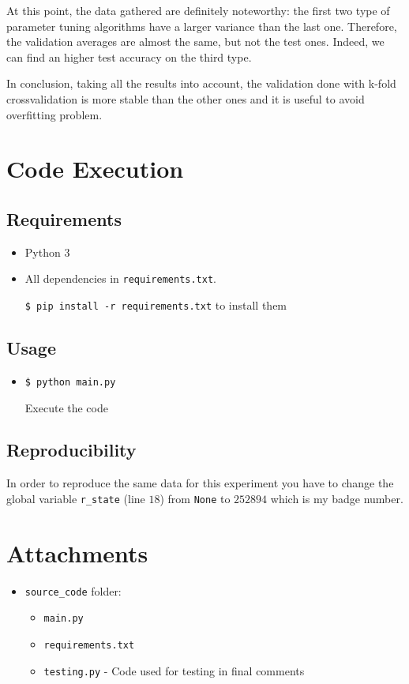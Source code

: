 \documentclass[a4paper, 11pt]{article}
\begin{document}
	At this point, the data gathered are definitely noteworthy: the first two type of parameter tuning algorithms have a larger variance than the last one. Therefore, the validation averages are almost the same, but not the test ones. Indeed, we can find an higher test accuracy on the third type.
	
	In conclusion, taking all the results into account, the validation done with k-fold crossvalidation is more stable than the other ones and it is useful to avoid overfitting problem.
		
	\section{Code Execution}
	\subsection{Requirements}
	\begin{itemize}
		\item Python 3
		\item All dependencies in \texttt{requirements.txt}.
		
		\texttt{\$ pip install -r requirements.txt} to install them
	\end{itemize}
	\subsection{Usage}
	\begin{itemize}
		\item \texttt{\$ python main.py}
		
		Execute the code
		
	\end{itemize}
	\subsection{Reproducibility}
	In order to reproduce the same data for this experiment you have to change the global variable \texttt{r\_state} (line $18$) from \texttt{None} to $252894$ which is my badge number.

	\section*{Attachments}
	\begin{itemize}
		\item \texttt{source\_code} folder:
		\begin{itemize}
			\item \texttt{main.py}
			\item \texttt{requirements.txt}
			\item \texttt{testing.py} - Code used for testing in final comments
		\end{itemize}
	\end{itemize}
	
\end{document}
